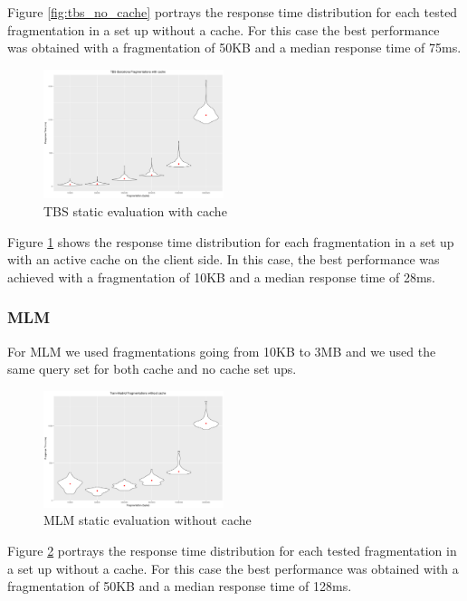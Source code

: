 \documentclass[sw]{iosart2x}
\begin{document}
	Figure \ref{fig:tbs_no_cache} portrays the response time distribution for each tested fragmentation in a set up without a cache. For this case the best performance was obtained with a fragmentation of 50KB and a median response time of 75ms.
	
	\begin{figure}[h]
		\includegraphics[width=0.47\textwidth]{tbs/cache.png}
		\caption{TBS static evaluation with cache}\label{fig:tbs_cache}
	\end{figure}
	
	Figure \ref{fig:tbs_cache} shows the response time distribution for each fragmentation in a set up with an active cache on the client side. In this case, the best performance was achieved with a fragmentation of 10KB and a median response time of 28ms.
	
	\subsubsection{MLM}
	For MLM we used fragmentations going from 10KB to 3MB and we used the same query set for both cache and no cache set ups.
	
	\begin{figure}[h]
		\includegraphics[width=0.47\textwidth]{mlm/static_no_cache.png}
		\caption{MLM static evaluation without cache}\label{fig:mlm_static_no_cache}
	\end{figure}
	
	Figure \ref{fig:mlm_static_no_cache} portrays the response time distribution for each tested fragmentation in a set up without a cache. For this case the best performance was obtained with a fragmentation of 50KB and a median response time of 128ms.
	
\end{document}
